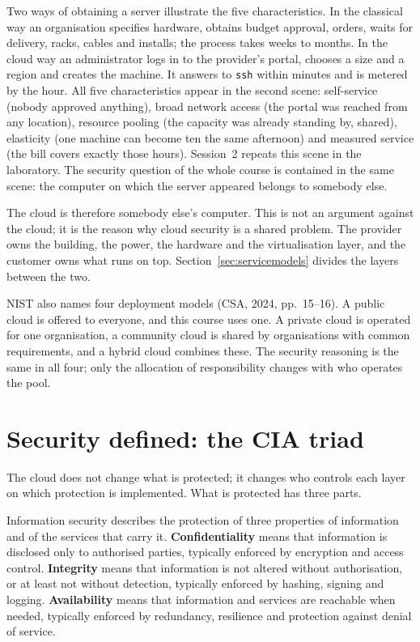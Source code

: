 \begin{example}\label{ex:vm}
Two ways of obtaining a server illustrate the five characteristics. In the
classical way an organisation specifies hardware, obtains budget approval,
orders, waits for delivery, racks, cables and installs; the process takes weeks
to months. In the cloud way an administrator logs in to the provider's portal,
chooses a size and a region and creates the machine. It answers to
\texttt{ssh} within minutes and is metered by the hour. All five characteristics
appear in the second scene: self-service (nobody approved anything), broad
network access (the portal was reached from any location), resource pooling
(the capacity was already standing by, shared), elasticity (one machine can
become ten the same afternoon) and measured service (the bill covers exactly
those hours). Session~2 repeats this scene in the laboratory. The security
question of the whole course is contained in the same scene: the computer on
which the server appeared belongs to somebody else.
\end{example}

The cloud is therefore somebody else's computer. This is not an argument
against the cloud; it is the reason why cloud security is a shared problem.
The provider owns the building, the power, the hardware and the
virtualisation layer, and the customer owns what runs on top.
Section~\ref{sec:servicemodels} divides the layers between the two.

NIST also names four deployment models (CSA, 2024, pp.~15--16). A public
cloud is offered to everyone, and this course uses one. A private cloud is
operated for one organisation, a community cloud is shared by organisations
with common requirements, and a hybrid cloud combines these. The security
reasoning is the same in all four; only the allocation of responsibility
changes with who operates the pool.

\section{Security defined: the CIA triad}

The cloud does not change what is protected; it changes who controls each
layer on which protection is implemented. What is protected has three parts.

\begin{definition}\label{def:cia}
Information security describes the protection of three properties of
information and of the services that carry it. \textbf{Confidentiality}
means that information is disclosed only to authorised parties, typically
enforced by encryption and access control. \textbf{Integrity} means that
information is not altered without authorisation, or at least not without
detection, typically enforced by hashing, signing and logging.
\textbf{Availability} means that information and services are reachable
when needed, typically enforced by redundancy, resilience and protection
against denial of service.
\end{definition}

